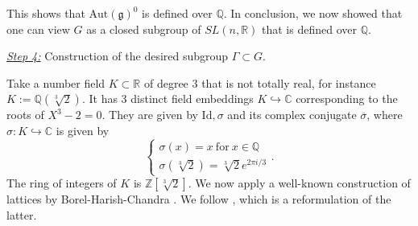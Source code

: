\documentclass[11pt, letterpaper, oneside,reqno]{amsart}
\theoremstyle{plain}
\theoremstyle{underline}
\theoremstyle{definition}
\theoremstyle{remark}
\begin{document}
	This shows that $\text{Aut}(\mathfrak{g})^{0}$ is defined over $\mathbb{Q}$. 
	In conclusion, we now showed that one can view $G$ as a closed subgroup of  $SL(n,\mathbb{R})$ that is defined over $\mathbb{Q}$.
	
	\vspace{0.2cm}
	\underline{\emph{Step 4:}} Construction of the desired subgroup $\Gamma\subset G$.
	
	Take a number field $K\subset\mathbb{R}$ of degree $3$ that is not totally real, for instance $K:=\mathbb{Q}(\sqrt[3]{2})$. It has $3$ distinct field embeddings $K\hookrightarrow\mathbb{C}$ corresponding to the roots of $X^{3}-2=0$. They are given by $\text{Id},\sigma$ and its complex conjugate $\overline{\sigma}$, where $\sigma:K\hookrightarrow\mathbb{C}$ is given by 
	\[
	\begin{cases}
		\sigma(x)=x\ \text{for}\ x\in\mathbb{Q}\\
		\sigma(\sqrt[3]{2})=\sqrt[3]{2}e^{2\pi i/3}
	\end{cases}.
	\]
	The ring of integers of $K$ is $\mathbb{Z}[\sqrt[3]{2}]$. We now apply a well-known construction of lattices by Borel-Harish-Chandra \cite{harish}. We follow \cite[Prop.~5.5.8]{Witte}, which is a reformulation of the latter.
	
\end{document}

